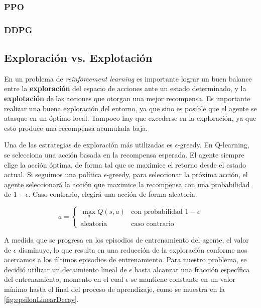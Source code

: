 \newpage


\subsubsection{PPO}

\subsubsection{DDPG}

\subsection{Exploración vs. Explotación}

En un problema de \textit{reinforcement learning} es importante lograr un buen balance entre la \textbf{exploración} del espacio de acciones ante un estado determinado, y la \textbf{explotación} de las acciones que otorgan una mejor recompensa. Es importante realizar una buena exploración del entorno, ya que sino es posible que el agente se atasque en un óptimo local. Tampoco hay que excederse en la exploración, ya que esto produce una recompensa acumulada baja.

Una de las estrategias de exploración más utilizadas es $\epsilon$-greedy. En Q-learning, se selecciona una acción basada en la recompensa esperada. El agente siempre elige la acción óptima, de forma tal que se maximice el retorno desde el estado actual. Si seguimos una política $\epsilon$-greedy, para seleccionar la próxima acción, el agente seleccionará la acción que maximice la recompensa con una probabilidad de $1-\epsilon$. Caso contrario, elegirá una acción de forma aleatoria.

\[
a = 
\begin{cases} 
    \max_{a} Q(s,a) & \text{con probabilidad } 1 - \epsilon  \\
    \text{aleatoria} & \text{caso contrario}
\end{cases}
\]

A medida que se progresa en los episodios de entrenamiento del agente, el valor de $\epsilon$ disminuye, lo que resulta en una reducción de la exploración conforme nos acercamos a los últimos episodios de entrenamiento. Para nuestro problema, se decidió utilizar un decaimiento lineal de $\epsilon$ hasta alcanzar una fracción específica del entrenamiento, momento en el cual $\epsilon$ se mantiene constante en un valor mínimo hasta el final del proceso de aprendizaje, como se muestra en la  \autoref{fig:epsilonLinearDecay}.

